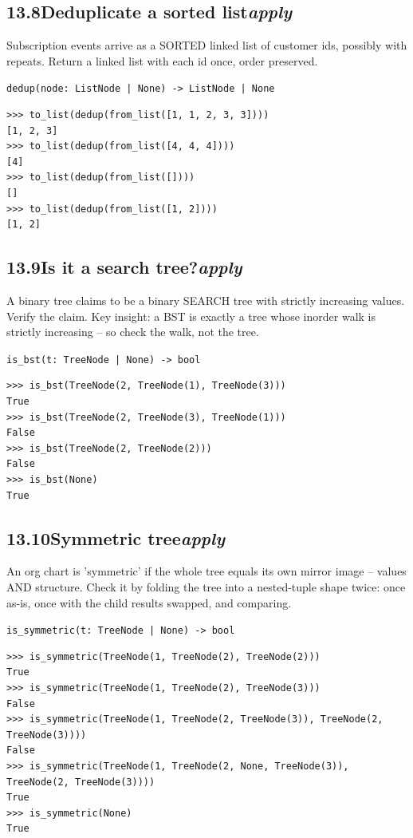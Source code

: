 \documentclass[10pt,letterpaper]{book}
\begin{document}
\subsection*{13.8\quad Deduplicate a sorted list\hfill\textnormal{\textit{apply}}}
Subscription events arrive as a SORTED linked list of customer ids, possibly with repeats. Return a linked list with each id once, order preserved.

\noindent\texttt{dedup(node: ListNode | None) -> ListNode | None}
\begin{lstlisting}[style=ex]
>>> to_list(dedup(from_list([1, 1, 2, 3, 3])))
[1, 2, 3]
>>> to_list(dedup(from_list([4, 4, 4])))
[4]
>>> to_list(dedup(from_list([])))
[]
>>> to_list(dedup(from_list([1, 2])))
[1, 2]
\end{lstlisting}
\subsection*{13.9\quad Is it a search tree?\hfill\textnormal{\textit{apply}}}
A binary tree claims to be a binary SEARCH tree with strictly increasing values. Verify the claim. Key insight: a BST is exactly a tree whose inorder walk is strictly increasing -- so check the walk, not the tree.

\noindent\texttt{is\_bst(t: TreeNode | None) -> bool}
\begin{lstlisting}[style=ex]
>>> is_bst(TreeNode(2, TreeNode(1), TreeNode(3)))
True
>>> is_bst(TreeNode(2, TreeNode(3), TreeNode(1)))
False
>>> is_bst(TreeNode(2, TreeNode(2)))
False
>>> is_bst(None)
True
\end{lstlisting}
\subsection*{13.10\quad Symmetric tree\hfill\textnormal{\textit{apply}}}
An org chart is 'symmetric' if the whole tree equals its own mirror image -- values AND structure. Check it by folding the tree into a nested-tuple shape twice: once as-is, once with the child results swapped, and comparing.

\noindent\texttt{is\_symmetric(t: TreeNode | None) -> bool}
\begin{lstlisting}[style=ex]
>>> is_symmetric(TreeNode(1, TreeNode(2), TreeNode(2)))
True
>>> is_symmetric(TreeNode(1, TreeNode(2), TreeNode(3)))
False
>>> is_symmetric(TreeNode(1, TreeNode(2, TreeNode(3)), TreeNode(2, TreeNode(3))))
False
>>> is_symmetric(TreeNode(1, TreeNode(2, None, TreeNode(3)), TreeNode(2, TreeNode(3))))
True
>>> is_symmetric(None)
True
\end{lstlisting}
\end{document}
